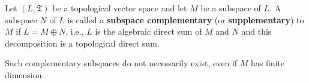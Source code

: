 Let $(L, \mathfrak{T})$ be a topological vector space and let $M$ be a subspace of $L$. A subspace $N$ of $L$ is called a \textbf{subspace complementary} (or \textbf{supplementary}) to $M$ if $L = M \oplus N$, i.e., $L$ is the algebraic direct sum of $M$ and $N$ and this decomposition is a topological direct sum.

Such complementary subspaces do not necessarily exist, even if $M$ has finite dimension.
